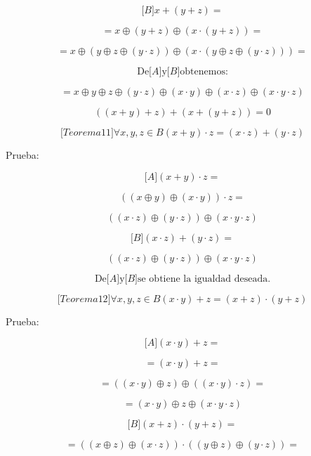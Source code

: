 \documentclass[
]{article}
\begin{document}
\begin{enumerate}
\begin{enumerate}
\begin{enumerate}
      \[{\lbrack B\rbrack}{{x + {({y + z})}} =}\]

      \[{= x} \oplus {({y + z})} \oplus {{({x \cdot {({y + z})}})} =}\]

      \[{= x} \oplus {({y \oplus z \oplus {({y \cdot z})}})} \oplus {{({x \cdot {({y \oplus z \oplus {({y \cdot z})}})}})} =}\]

      \[\text{De}{\lbrack A\rbrack}\text{y}{\lbrack B\rbrack}\text{obtenemos:}\]

      \[{= x} \oplus y \oplus z \oplus {({y \cdot z})} \oplus {({x \cdot y})} \oplus {({x \cdot z})} \oplus {({{x \cdot y} \cdot z})}\]

      \[{\left( {{({x + y})} + z} \right) + \left( {x + {({y + z})}} \right)} = 0\]

      \[{\lbrack{{Teorema}11}\rbrack}\forall x,y,{z \in B}{{{({x + y})} \cdot z} = {{({x \cdot z})} + {({y \cdot z})}}}\]

      Prueba:

      \[{\lbrack A\rbrack}{{{({x + y})} \cdot z} =}\]

      \[{{({{({x \oplus y})} \oplus {({x \cdot y})}})} \cdot z} =\]

      \[{({{({x \cdot z})} \oplus {({y \cdot z})}})} \oplus {({{x \cdot y} \cdot z})}\]

      \[{\lbrack B\rbrack}{{{({x \cdot z})} + {({y \cdot z})}} =}\]

      \[{({{({x \cdot z})} \oplus {({y \cdot z})}})} \oplus {({{x \cdot y} \cdot z})}\]

      \[\text{De}{\lbrack A\rbrack}\text{y}{\lbrack B\rbrack}\text{se obtiene la igualdad deseada.}\]

      \[{\lbrack{{Teorema}12}\rbrack}\forall x,y,{z \in B}{{{({x \cdot y})} + z} = {{({x + z})} \cdot {({y + z})}}}\]

      Prueba:

      \[{\lbrack A\rbrack}{{{({x \cdot y})} + z} =}\]

      \[{= {{({x \cdot y})} + z}} =\]

      \[{= {({{({x \cdot y})} \oplus z})}} \oplus {{({{({x \cdot y})} \cdot z})} =}\]

      \[{= {({x \cdot y})}} \oplus z \oplus {({{x \cdot y} \cdot z})}\]

      \[{\lbrack B\rbrack}{{{({x + z})} \cdot {({y + z})}} =}\]

      \[{= {{({{({x \oplus z})} \oplus {({x \cdot z})}})} \cdot {({{({y \oplus z})} \oplus {({y \cdot z})}})}}} =\]


\end{enumerate}
\end{enumerate}
\end{enumerate}
\end{document}
